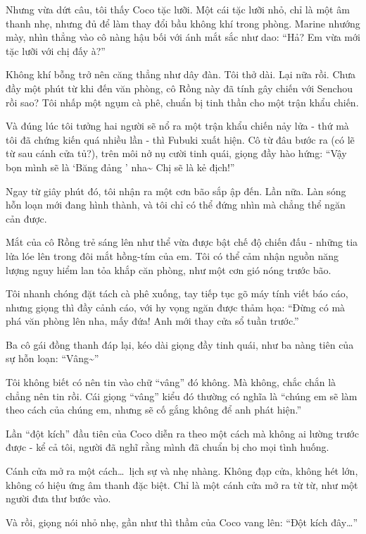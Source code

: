 \documentclass[../main.tex]{subfiles}
\begin{document}
Nhưng vừa dứt câu, tôi thấy Coco tặc lưỡi. Một cái tặc lưỡi nhỏ, chỉ là một âm thanh nhẹ, nhưng đủ để làm thay đổi bầu không khí trong phòng. Marine nhướng mày, nhìn thẳng vào cô nàng hậu bối với ánh mắt sắc như dao: ``Hả? Em vừa mới tặc lưỡi với chị đấy à?''

Không khí bỗng trở nên căng thẳng như dây đàn. Tôi thở dài. Lại nữa rồi. Chưa đầy một phút từ khi đến văn phòng, cô Rồng này đã tính gây chiến với Senchou rồi sao? Tôi nhấp một ngụm cà phê, chuẩn bị tinh thần cho một trận khẩu chiến.

Và đúng lúc tôi tưởng hai người sẽ nổ ra một trận khẩu chiến nảy lửa - thứ mà tôi đã chứng kiến quá nhiều lần - thì Fubuki xuất hiện. Cô từ đâu bước ra (có lẽ từ sau cánh cửa tủ?), trên môi nở nụ cười tinh quái, giọng đầy hào hứng: ``Vậy bọn mình sẽ là `Băng đảng \hll' nha\~{} Chị sẽ là kẻ địch!''


Ngay từ giây phút đó, tôi nhận ra một cơn bão sắp ập đến. Lần nữa. Làn sóng hỗn loạn mới đang hình thành, và tôi chỉ có thể đứng nhìn mà chẳng thể ngăn cản được.

Mắt của cô Rồng trẻ sáng lên như thể vừa được bật chế độ chiến đấu - những tia lửa lóe lên trong đôi mắt hồng-tím của em. Tôi có thể cảm nhận nguồn năng lượng nguy hiểm lan tỏa khắp căn phòng, như một cơn gió nóng trước bão.

Tôi nhanh chóng đặt tách cà phê xuống, tay tiếp tục gõ máy tính viết báo cáo, nhưng giọng thì đầy cảnh cáo, với hy vọng ngăn được thảm họa: ``Đừng có mà phá văn phòng lên nha, mấy đứa! Anh mới thay cửa sổ tuần trước.''

Ba cô gái đồng thanh đáp lại, kéo dài giọng đầy tinh quái, như ba nàng tiên của sự hỗn loạn: ``Vâng\~{}''

Tôi không biết có nên tin vào chữ ``vâng'' đó không. Mà không, chắc chắn là chẳng nên tin rồi. Cái giọng ``vâng'' kiểu đó thường có nghĩa là ``chúng em sẽ làm theo cách của chúng em, nhưng sẽ cố gắng không để anh phát hiện.''

\ct

Lần ``đột kích'' đầu tiên của Coco diễn ra theo một cách mà không ai lường trước được - kể cả tôi, người đã nghĩ rằng mình đã chuẩn bị cho mọi tình huống.

Cánh cửa mở ra một cách\dots\ lịch sự và nhẹ nhàng. Không đạp cửa, không hét lớn, không có hiệu ứng âm thanh đặc biệt. Chỉ là một cánh cửa mở ra từ từ, như một người đưa thư bước vào.

Và rồi, giọng nói nhỏ nhẹ, gần như thì thầm của Coco vang lên: ``Đột kích đây\dots''
\end{document}
